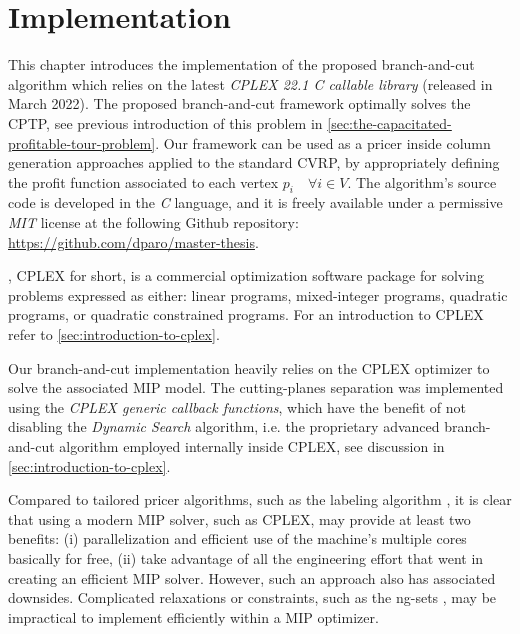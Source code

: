 \chapter{Implementation}
\label{sec:implementation-chapter}

This chapter introduces the implementation of the proposed
branch-and-cut algorithm which relies on the
latest \textit{CPLEX 22.1 C callable library} (released in March 2022).
The proposed branch-and-cut framework optimally solves the CPTP,
see previous introduction of this problem in \cref{sec:the-capacitated-profitable-tour-problem}.
Our framework can be used as a pricer
inside column generation approaches applied to the standard CVRP,
by appropriately defining the profit function associated to each vertex $p_i \quad \forall i \in V$.
The algorithm's source code is developed in the \textit{C} language,
and it is freely available under a permissive \textit{MIT} license
at the following Github repository: \url{https://github.com/dparo/master-thesis}.

\medskip

,
CPLEX for short,
is a commercial optimization software package for solving problems expressed as either:
linear programs, mixed-integer programs, quadratic programs, or quadratic constrained programs.
For an introduction to CPLEX refer to \cref{sec:introduction-to-cplex}.

Our branch-and-cut implementation heavily relies on the CPLEX optimizer
to solve the associated MIP model.
The cutting-planes separation was implemented using the \textit{CPLEX generic callback functions},
which have the benefit of not disabling the \textit{Dynamic Search} algorithm,
i.e. the proprietary advanced branch-and-cut algorithm employed internally inside CPLEX,
see discussion in \cref{sec:introduction-to-cplex}.

Compared to tailored pricer algorithms, such as the labeling algorithm \parencite{desrochers1992, feillet2004},
it is clear that using a modern MIP solver, such as CPLEX,
may provide at least two benefits:
(i) parallelization and efficient use of the machine's multiple cores basically for free,
(ii) take advantage of all the engineering effort that went in creating an efficient MIP solver.
However, such an approach also has associated downsides.
Complicated relaxations or constraints,
such as the ng-sets \parencite{baldacci2011},
may be impractical to implement efficiently within a MIP optimizer.

